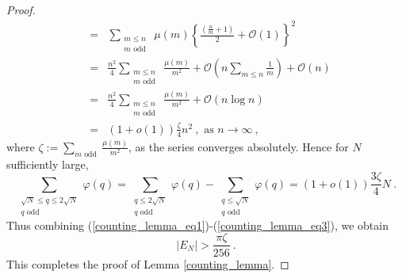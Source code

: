 \documentclass[12pt]{amsart}
\theoremstyle{definition}
\numberwithin{equation}{section}
\begin{document}
\begin{proof}
\begin{eqnarray*}
&=& \sum_{\substack{m \le n \\ m \text{ odd }}} \mu(m) \left\{ \frac{\left(\frac{n}{m}+1\right)}{2} + \mathcal{O}(1) \right\}^2 \\
&=& \frac{n^2}{4} \sum_{\substack{m \le n \\ m \text{ odd }}} \frac{\mu(m)}{m^2} + \mathcal{O}\left(n \sum_{m \le n}\frac{1}{m}\right) + \mathcal{O}(n) \\
&=& \frac{n^2}{4} \sum_{\substack{m \le n \\ m \text{ odd }}} \frac{\mu(m)}{m^2} + \mathcal{O}(n \log n) \\
&=& (1+o(1)) \frac{\zeta}{4}n^2\:, \text{ as } n \to \infty \:,
\end{eqnarray*}
where $\zeta:=\displaystyle\sum_{ m \text{ odd }} \frac{\mu(m)}{m^2}$, as the series converges absolutely. Hence for $N$ sufficiently large,
\begin{equation} \label{counting_lemma_eq3}
\sum_{\substack{\sqrt{N} \le q \le 2\sqrt{N} \\ q \text{ odd }}} \varphi(q) = \sum_{\substack{q \le 2\sqrt{N} \\ q \text{ odd }}} \varphi(q) - \sum_{\substack{q \le \sqrt{N} \\ q \text{ odd }}} \varphi(q) = (1+o(1)) \frac{3\zeta}{4}N\:.
\end{equation}
Thus combining (\ref{counting_lemma_eq1})-(\ref{counting_lemma_eq3}), we obtain
\begin{equation*}
|E_N| > \frac{\pi\zeta}{256}\:.
\end{equation*}
This completes the proof of Lemma \ref{counting_lemma}.
\end{proof}
\end{document}
